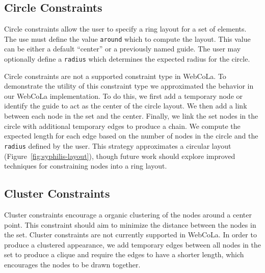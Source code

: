 
\subsection{Circle Constraints}
Circle constraints allow the user to specify a ring layout for a set of
elements. The use must define the value \texttt{around} which to compute 
the layout. This value can be either a default ``center'' or a previously 
named guide. The user may optionally define a \texttt{radius} which 
determines the expected radius for the circle.


Circle constraints are not a supported constraint type in WebCoLa. To 
demonstrate the utility of this constraint type we approximated the behavior
in our WebCoLa implementation. To do this, we first add a temporary node
or identify the guide to act as the center of the circle layout. We then add a link between each 
node in the set and the center. Finally, we link the set nodes in the circle
with additional temporary edges to produce a chain. We compute the expected
length for each edge based on the number of nodes in the circle and the 
\texttt{radius} defined by the user. This strategy approximates a circular
layout (Figure~\ref{fig:syphilis-layout}), though future work should
explore improved techniques for constraining nodes into a ring layout. 


\subsection{Cluster Constraints}
Cluster constraints encourage a organic clustering of the nodes around
a center point. This constraint should aim to minimize the distance between
the nodes in the set.
Cluster constraints are not currently supported in WebCoLa. In order to
produce a clustered appearance, we add temporary edges between all nodes
in the set to produce a clique and require the edges to have a shorter length,
which encourages the nodes to be drawn together.

